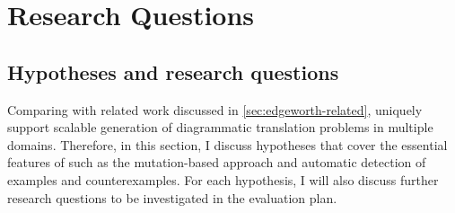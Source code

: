 



\section{Research Questions}


%
\subsection{Hypotheses and research questions}

Comparing with related work discussed in \cref{sec:edgeworth-related}, \Edgeworth uniquely support scalable generation of diagrammatic translation problems in multiple domains. Therefore, in this section, I discuss hypotheses that cover the essential features of \Edgeworth such as the mutation-based approach and automatic detection of examples and counterexamples. For each hypothesis, I will also discuss further research questions to be investigated in the evaluation plan. 


